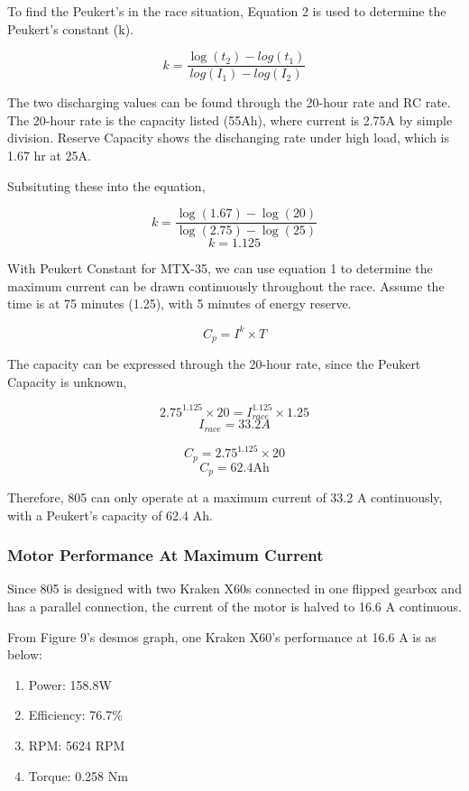 \documentclass[12pt]{article}
\begin{document}
To find the Peukert's in the race situation, Equation 2 is used to determine the Peukert's constant (k).

\begin{equation}
  k = \frac{\log(t_2) - log(t_1)}{log(I_1) - log(I_2)}
\end{equation}


The two discharging values can be found through the 20-hour rate and RC rate. The
20-hour rate is the capacity listed (55Ah), where current is 2.75A by simple division.
Reserve Capacity shows the dischanging rate under high load, which is 1.67 hr at 25A.

Subsituting these into the equation,

\[k = \frac{\log(1.67)-\log(20)}{\log(2.75)-\log(25)}\]
\[k = 1.125\]

With Peukert Constant for MTX-35, we can use equation 1 to determine the maximum current
can be drawn continuously throughout the race. Assume the time is at 75 minutes (1.25), with 5
minutes of energy reserve. 

\[C_p = I^k \times T\]

The capacity can be expressed through the 20-hour rate, since the Peukert Capacity is unknown,

\[2.75^{1.125} \times 20 = I_{race}^{1.125} \times 1.25\]
\[I_{race} = 33.2 A\]

\[C_p = 2.75^{1.125} \times 20\]
\[C_p = 62.4 \text{Ah}\]

Therefore, 805 can only operate at a maximum current of 33.2 A continuously, with a
Peukert's capacity of 62.4 Ah.

\subsubsection*{Motor Performance At Maximum Current}

Since 805 is designed with two Kraken X60s connected in one flipped gearbox and has
a parallel connection, the current of the motor is halved to 16.6 A continuous.

From Figure 9's desmos graph, one Kraken X60's performance at 16.6 A is as below:
\begin{enumerate}
  \item Power: 158.8W
  \item Efficiency: 76.7\%
  \item RPM: 5624 RPM
  \item Torque: 0.258 Nm
\end{enumerate}
\end{document}
